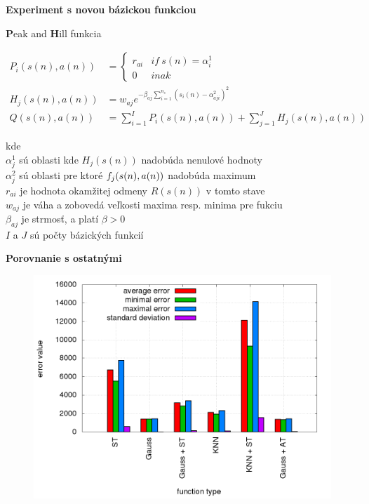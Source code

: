\documentclass[xcolor=dvipsnames]{beamer}
\begin{document}
\begin{frame}{\bf Experiment s novou bázickou funkciou}

{\bf P}eak and {\bf H}ill funkcia

\begin{align}
P_i(s(n), a(n)) &=
\left\{
	\begin{array}{ll}
		r_{ai}  & if \ s(n) = \alpha^1_i \\
		0 & inak
	\end{array}
\right. \\
  H_j(s(n), a(n)) &= w_{aj} e^{ -\beta_{aj} \sum\limits_{i=1}^{n_s}{(s_i(n) - \alpha^2_{aji})^2 }} \\
  Q(s(n), a(n)) &= \sum\limits_{i=1}^{I} P_i(s(n),a(n)) + \sum\limits_{j=1}^{J} H_j(s(n), a(n))
  \label{eq:peak_hill}
\end{align}

kde \\
$\alpha^1_j$ sú oblasti kde $H_j(s(n))$ nadobúda nenulové hodnoty \\
$\alpha^2_j$ sú oblasti pre ktoré $f_j(\boldmath{s(n), a(n)})$ nadobúda maximum \\
$r_{ai}$ je hodnota okamžitej odmeny $R(s(n))$ v tomto stave \\
$w_{aj}$ je váha a zobovedá veľkosti maxima resp. minima pre fukciu \\
$\beta_{aj}$ je strmosť, a platí $\beta > 0$ \\
$I$ a $J$ sú počty bázických funkcií \\

\end{frame}


\begin{frame}{\bf Porovnanie s ostatnými}

\begin{figure}[!htb]
\centering
\includegraphics[scale=.4]{../../results_q_learning/map_2/trials_average_results.png}
\end{figure}

\end{frame}
\end{document}
